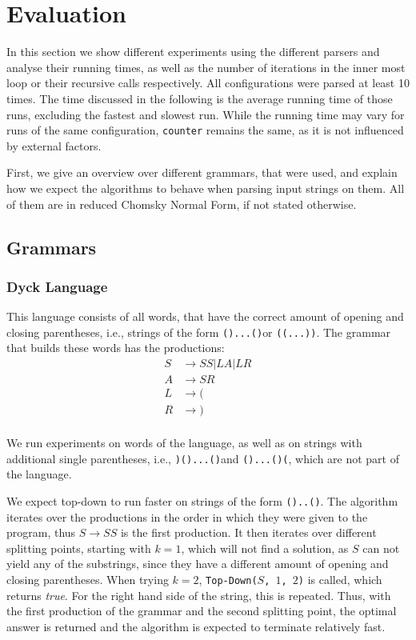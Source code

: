 \section{Evaluation}
\label{sec:Evaluation}
In this section we show different experiments using the different parsers and analyse their running times, as well as the number of iterations in the inner most loop or their recursive calls respectively.
All configurations were parsed at least 10 times.
The time discussed in the following is the average running time of those runs, excluding the fastest and slowest run.
While the running time may vary for runs of the same configuration, \texttt{counter} remains the same, as it is not influenced by external factors.

First, we give an overview over different grammars, that were used, and explain how we expect the algorithms to behave when parsing input strings on them.
All of them are in reduced Chomsky Normal Form, if not stated otherwise.

\subsection{Grammars}
\subsubsection{Dyck Language}
This language consists of all words, that have the correct amount of opening and closing parentheses, i.e., strings of the form \texttt{()...()}or \texttt{((...))}.
The grammar that builds these words has the productions:
\begin{align*}
    S&\rightarrow SS|LA|LR\\
    A&\rightarrow SR\\
    L&\rightarrow (\\
    R&\rightarrow )\\
\end{align*}

We run experiments on words of the language, as well as on strings with additional single parentheses, i.e., \texttt{)()...()}and \texttt{()...()(}, which are not part of the language.

We expect top-down to run faster on strings of the form \texttt{()..()}.
The algorithm iterates over the productions in the order in which they were given to the program, thus $S\rightarrow SS$ is the first production.
It then iterates over different splitting points, starting with $k=1$, which will not find a solution, as $S$ can not yield any of the substrings, since they have a different amount of opening and closing parentheses.
When trying $k=2$, \texttt{Top-Down($S$, $1$, $2$)} is called, which returns \textit{true}.
For the right hand side of the string, this is repeated.
Thus, with the first production of the grammar and the second splitting point, the optimal answer is returned and the algorithm is expected to terminate relatively fast.


